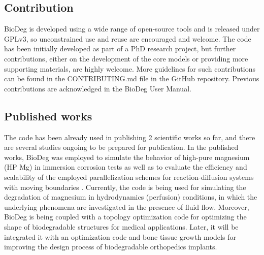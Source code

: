 \subsection{Contribution}

BioDeg is developed using a wide range of open-source tools and is released under GPLv3, so unconstrained use and reuse are encouraged and welcome. The code has been initially developed as part of a PhD research project, but further contributions, either on the development of the core models or providing more supporting materials, are highly welcome. More guidelines for such contributions can be found in the CONTRIBUTING.md file in the GitHub repository. Previous contributions are acknowledged in the BioDeg User Manual.

\subsection{Published works}

The code has been already used in publishing 2 scientific works so far, and there are several studies ongoing to be prepared for publication. In the published works, BioDeg was employed to simulate the behavior of high-pure magnesium (HP Mg) in immersion corrosion tests \cite{Barzegari2021} as well as to evaluate the efficiency and scalability of the employed parallelization schemes for reaction-diffusion systems with moving boundaries \cite{Barzegari2022}. Currently, the code is being used for simulating the degradation of magnesium in hydrodynamics (perfusion) conditions, in which the underlying phenomena are investigated in the presence of fluid flow. Moreover, BioDeg is being coupled with a topology optimization code for optimizing the shape of biodegradable structures for medical applications. Later, it will be integrated it with an optimization code and bone tissue growth models for improving the design process of biodegradable orthopedics implants.

%




\cleardoublepage

